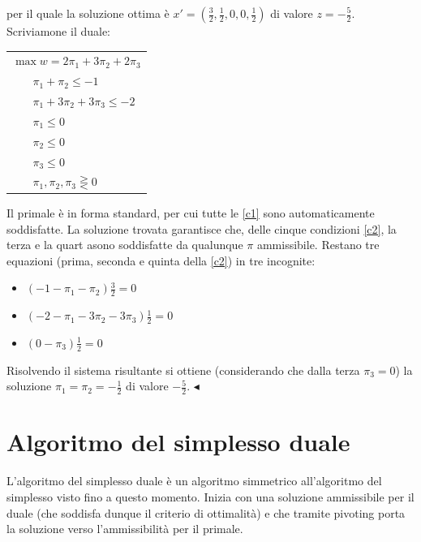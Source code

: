 \documentclass[11pt]{book}
\begin{document}
per il quale la soluzione ottima \`e $x' =
(\frac{3}{2},\frac{1}{2},0,0,\frac{1}{2})$ di valore $z =
-\frac{5}{2}$. Scriviamone il duale:

\vspace{11pt}
\begin{center}
\begin{tabular}{l}
$\max w = 2\pi_1 + 3\pi_2 + 2\pi_3$\\
$\phantom{min}\pi_1 + \pi_2 \leq -1$\\
$\phantom{min}\pi_1 + 3\pi_2 + 3\pi_3 \leq -2$\\
$\phantom{min}\pi_1 \leq 0$\\
$\phantom{min}\pi_2 \leq 0$\\
$\phantom{min}\pi_3 \leq 0$\\
$\phantom{min}\pi_1, \pi_2, \pi_3 \gtreqless 0$\\
\end{tabular}
\end{center}
\vspace{11pt}

Il primale \`e in forma standard, per cui tutte le \ref{c1} sono
automaticamente soddisfatte. La soluzione trovata garantisce che,
delle cinque condizioni \ref{c2}, la terza e la quart asono
soddisfatte da qualunque $\pi$ ammissibile. Restano tre equazioni
(prima, seconda e quinta della \ref{c2}) in tre incognite:

\begin{itemize}
\item $(-1-\pi_1-\pi_2)\frac{3}{2} = 0$
\item $(-2-\pi_1-3\pi_2-3\pi_3)\frac{1}{2} = 0$
\item $(0-\pi_3)\frac{1}{2} = 0$
\end{itemize}

Risolvendo il sistema risultante si ottiene (considerando che dalla
terza $\pi_3 = 0$) la soluzione $\pi_1 = \pi_2 = -\frac{1}{2}$ di
valore $-\frac{5}{2}$. $\blacktriangleleft$
\vspace{11pt}


\section{Algoritmo del simplesso duale}

L'algoritmo del simplesso duale \`e un algoritmo simmetrico
all'algoritmo del simplesso visto fino a questo momento. Inizia con
una soluzione ammissibile per il duale (che soddisfa dunque il
criterio di ottimalit\`a) e che tramite pivoting porta la soluzione
verso l'ammissibilit\`a per il primale.
\end{document}
